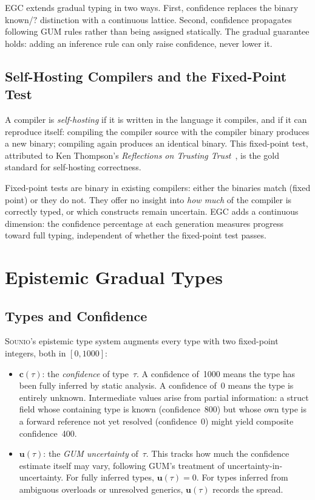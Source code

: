 \documentclass[acmsmall,screen,review,anonymous]{acmart}
\newcommand{\sounio}{\textsc{Sounio}\xspace}
\newcommand{\conf}[1]{\mathbf{c}(#1)}
\newcommand{\unc}[1]{\mathbf{u}(#1)}
\begin{document}
EGC extends gradual typing in two ways.
First, confidence replaces the binary known/$?$ distinction with a
continuous lattice.
Second, confidence propagates following GUM rules rather than being
assigned statically.
The gradual guarantee holds: adding an inference rule can only raise
confidence, never lower it.

\subsection{Self-Hosting Compilers and the Fixed-Point Test}

A compiler is \emph{self-hosting} if it is written in the language it
compiles, and if it can reproduce itself: compiling the compiler source
with the compiler binary produces a new binary; compiling again produces
an identical binary.
This fixed-point test, attributed to Ken Thompson's
\emph{Reflections on Trusting Trust}~\cite{thompson1984trusting},
is the gold standard for self-hosting correctness.

Fixed-point tests are binary in existing compilers: either the binaries
match (fixed point) or they do not.
They offer no insight into \emph{how much} of the compiler is
correctly typed, or which constructs remain uncertain.
EGC adds a continuous dimension: the confidence percentage at each
generation measures progress toward full typing, independent of whether
the fixed-point test passes.

\section{Epistemic Gradual Types}
\label{sec:egc}

\subsection{Types and Confidence}

\sounio's epistemic type system augments every type with two fixed-point
integers, both in $[0, 1000]$:

\begin{itemize}
\item $\conf{\tau}$: the \emph{confidence} of type~$\tau$.
  A confidence of~1000 means the type has been fully inferred by static
  analysis.
  A confidence of~0 means the type is entirely unknown.
  Intermediate values arise from partial information: a struct field whose
  containing type is known (confidence~800) but whose own type is a
  forward reference not yet resolved (confidence~0) might yield composite
  confidence~400.

\item $\unc{\tau}$: the \emph{GUM uncertainty} of~$\tau$.
  This tracks how much the confidence estimate itself may vary,
  following GUM's treatment of uncertainty-in-uncertainty.
  For fully inferred types, $\unc{\tau} = 0$.
  For types inferred from ambiguous overloads or unresolved generics,
  $\unc{\tau}$ records the spread.
\end{itemize}
\end{document}
